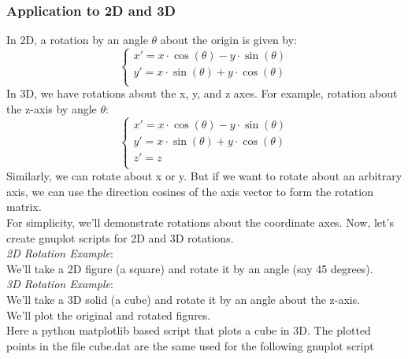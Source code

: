 \documentclass[a4paper,10pt]{article}
\begin{document}
\subsubsection{Application to 2D and 3D}
In 2D, a rotation by an angle $\theta$ about the origin is given by:
\[
\begin{cases}
   x' = x\cdot \cos(\theta) - y\cdot \sin(\theta)\\
   y' = x\cdot \sin(\theta) + y\cdot \cos(\theta)\\
\end{cases}
\]
In 3D, we have rotations about the x, y, and z axes. For example, rotation about the z-axis by
angle $\theta$:
\[
\begin{cases}
   x' = x\cdot \cos(\theta) - y\cdot \sin(\theta)\\
   y' = x\cdot \sin(\theta) + y\cdot \cos(\theta)\\
   z' = z \\
\end{cases}
\]
Similarly, we can rotate about x or y.
But if we want to rotate about an arbitrary axis, we can use the direction cosines of the axis
vector to form the rotation matrix.\\
For simplicity, we'll demonstrate rotations about the coordinate axes.
Now, let's create gnuplot scripts for 2D and 3D rotations.\\
\emph{2D Rotation Example}:\\
We'll take a 2D figure (a square) and rotate it by an angle (say 45 degrees).\\
\emph{3D Rotation Example}:\\
We'll take a 3D solid (a cube) and rotate it by an angle about the z-axis.\\
We'll plot the original and rotated figures.\\
Here a python matplotlib based script that plots a cube in 3D. The plotted points in the file cube.dat are the same used for the following gnuplot script\\
\end{document}

